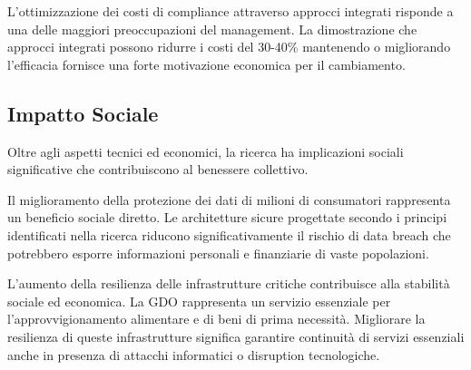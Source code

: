 \documentclass[12pt,a4paper,oneside]{book}
\numberwithin{figure}{chapter} %
\numberwithin{table}{chapter}  %
\begin{document}
L'ottimizzazione dei costi di compliance attraverso approcci integrati
risponde a una delle maggiori preoccupazioni del management. La
dimostrazione che approcci integrati possono ridurre i costi del 30-40\%
mantenendo o migliorando l'efficacia fornisce una forte motivazione
economica per il cambiamento.

\subsection{\texorpdfstring{\textbf{Impatto
Sociale}}{1.8.3 Impatto Sociale}}\label{impatto-sociale}

Oltre agli aspetti tecnici ed economici, la ricerca ha implicazioni
sociali significative che contribuiscono al benessere collettivo.

Il miglioramento della protezione dei dati di milioni di consumatori
rappresenta un beneficio sociale diretto. Le architetture sicure
progettate secondo i principi identificati nella ricerca riducono
significativamente il rischio di data breach che potrebbero esporre
informazioni personali e finanziarie di vaste popolazioni.

L'aumento della resilienza delle infrastrutture critiche contribuisce
alla stabilità sociale ed economica. La GDO rappresenta un servizio
essenziale per l'approvvigionamento alimentare e di beni di prima
necessità. Migliorare la resilienza di queste infrastrutture significa
garantire continuità di servizi essenziali anche in presenza di attacchi
informatici o disruption tecnologiche.
\end{document}
